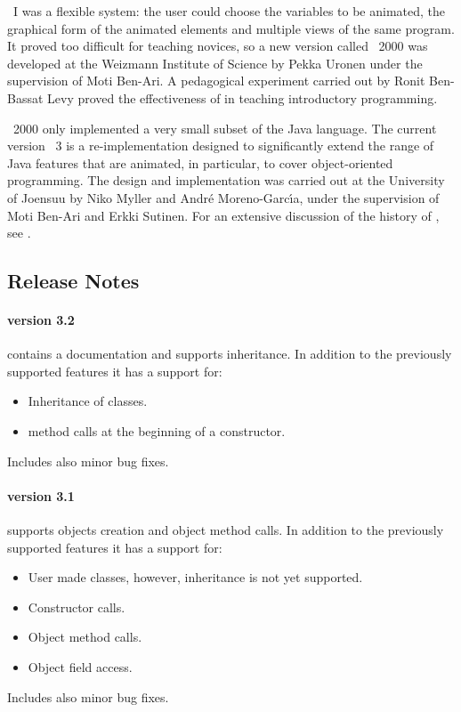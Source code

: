 \jel{}~I was a flexible system: the user could choose the variables to
be animated, the graphical form of the animated elements and multiple
views of the same program. It proved too difficult for teaching novices,
so a new version called \jel{}~2000 was developed at the Weizmann Institute
of Science by Pekka Uronen under the supervision of Moti Ben-Ari.
A pedagogical experiment carried out by Ronit Ben-Bassat Levy proved
the effectiveness of \jel{} in teaching introductory programming.

\jel{}~2000 only implemented a very small subset of the Java language.
The current version \jel{}~3 is a re-implementation designed to
significantly extend the range of Java features that are animated,
in particular, to cover object-oriented programming. The design and
implementation was carried out at the University of Joensuu by
Niko Myller and Andr{\'{e}} Moreno-Garc{\'{\i}}a, under the supervision
of Moti Ben-Ari and Erkki Sutinen. For an extensive discussion of the
history of \jel{}, see \citep{Benari2002a}.

\subsection{Release Notes}
\label{sec:Release_Notes}

\paragraph{version 3.2} contains a documentation and supports inheritance.
In addition to the previously supported features it has a support for:
\begin{itemize}
\item Inheritance of classes.
\item {} method calls at the beginning of a constructor.
\end{itemize}
Includes also minor bug fixes.

\paragraph{version 3.1} supports objects creation and object method calls.
In addition to the previously supported features it has a support for:
\begin{itemize}
\item User made classes, however, inheritance is not yet supported. 
\item Constructor calls.
\item Object method calls.
\item Object field access.
\end{itemize}
Includes also minor bug fixes.

